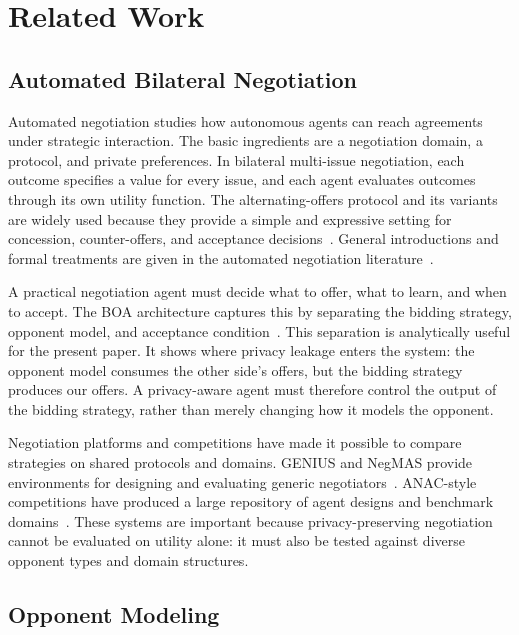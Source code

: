 \documentclass[runningheads]{llncs}
\begin{document}
\section{Related Work}
\label{sec:related}

\subsection{Automated Bilateral Negotiation}

Automated negotiation studies how autonomous agents can reach agreements under strategic interaction. The basic ingredients are a negotiation domain, a protocol, and private preferences. In bilateral multi-issue negotiation, each outcome specifies a value for every issue, and each agent evaluates outcomes through its own utility function. The alternating-offers protocol and its variants are widely used because they provide a simple and expressive setting for concession, counter-offers, and acceptance decisions~\cite{AOP,SAOP}. General introductions and formal treatments are given in the automated negotiation literature~\cite{principles_negotiation,survey_opponentmodel}.

A practical negotiation agent must decide what to offer, what to learn, and when to accept. The BOA architecture captures this by separating the bidding strategy, opponent model, and acceptance condition~\cite{BOA}. This separation is analytically useful for the present paper. It shows where privacy leakage enters the system: the opponent model consumes the other side's offers, but the bidding strategy produces our offers. A privacy-aware agent must therefore control the output of the bidding strategy, rather than merely changing how it models the opponent.

Negotiation platforms and competitions have made it possible to compare strategies on shared protocols and domains. GENIUS and NegMAS provide environments for designing and evaluating generic negotiators~\cite{Genius,Negmas}. ANAC-style competitions have produced a large repository of agent designs and benchmark domains~\cite{anac2010,anac2011,anac2022}. These systems are important because privacy-preserving negotiation cannot be evaluated on utility alone: it must also be tested against diverse opponent types and domain structures.

\subsection{Opponent Modeling}
\end{document}
